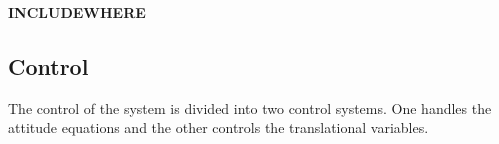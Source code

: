 \begin{itemize}
\textbf{INCLUDEWHERE}
%
\subsection{Control}
The control of the system is divided into two control systems. One handles the attitude equations and the other controls the translational variables. 

\end{itemize}

